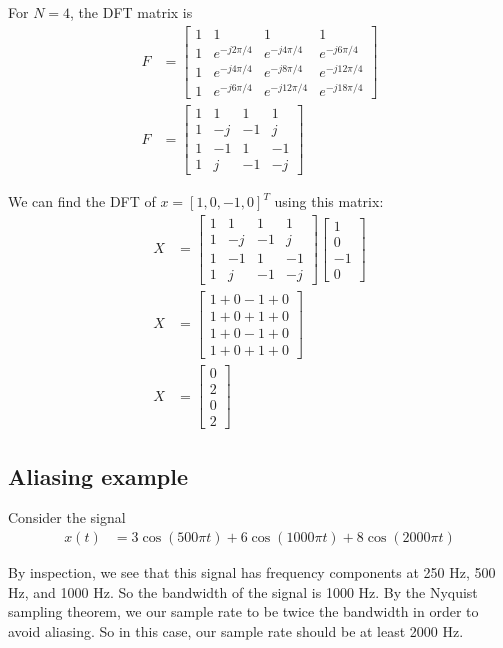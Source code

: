 \documentclass[twocolumn]{myarticle}
\newcommand{\mat}[1]{\begin{bmatrix}#1\end{bmatrix}}
\begin{document}
For $ N = 4 $, the DFT matrix is
\begin{align}
    F &= \mat{1 & 1 & 1 & 1 \\ 1 & e^{-j 2 \pi / 4} & e^{-j 4 \pi / 4} & e^{- j 6 \pi / 4} \\ 1 & e^{- j 4 \pi / 4} & e^{-j 8 \pi / 4} & e^{-j 12 \pi / 4} \\ 1 & e^{-j 6 \pi / 4} & e^{-j 12 \pi / 4} & e^{-j 18 \pi / 4} }
    \\
    F &= \mat{1 & 1 & 1 & 1 \\ 1 & -j & -1 & j \\ 1 & -1 & 1 & -1 \\ 1 & j & -1 & -j }
\end{align}

We can find the DFT of $ x = \left[1, 0, -1, 0 \right]^T $ using this matrix:
\begin{align}
    X &= \mat{1 & 1 & 1 & 1 \\ 1 & -j & -1 & j \\ 1 & -1 & 1 & -1 \\ 1 & j & -1 & -j } \mat{1 \\ 0 \\ -1 \\ 0}
    \\
    X &= \mat{ 1 + 0 - 1 + 0 \\ 1 + 0 + 1 + 0 \\ 1 + 0 - 1 + 0 \\ 1 + 0 + 1 + 0 }
    \\
    X &= \mat{ 0 \\ 2 \\ 0 \\ 2 }
\end{align}

\subsection{Aliasing example}
\label{subsec:aliasing_example}

Consider the signal
\begin{align}
    x(t) &= 3 \cos(500 \pi t) + 6 \cos(1000 \pi t) + 8 \cos(2000 \pi t)
\end{align}

By inspection, we see that this signal has frequency components at 250 Hz, 500 Hz, and 1000 Hz.
So the bandwidth of the signal is 1000 Hz.
By the Nyquist sampling theorem, we our sample rate to be twice the bandwidth in order to avoid aliasing.
So in this case, our sample rate should be at least 2000 Hz.
\end{document}
